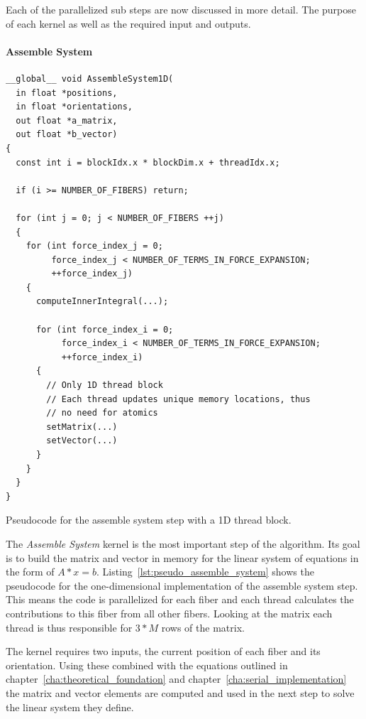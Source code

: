 \documentclass[a4paper,11pt]{kth-mag}
\begin{document}
Each of the parallelized sub steps are now discussed in more detail. The purpose of each kernel as well as the required input and outputs.

\paragraph{Assemble System}

\begin{listing}[!htbp]
  \centering
  \begin{verbatim}
__global__ void AssembleSystem1D(
  in float *positions,
  in float *orientations,
  out float *a_matrix,
  out float *b_vector)
{
  const int i = blockIdx.x * blockDim.x + threadIdx.x;

  if (i >= NUMBER_OF_FIBERS) return;

  for (int j = 0; j < NUMBER_OF_FIBERS ++j)
  {
    for (int force_index_j = 0;
         force_index_j < NUMBER_OF_TERMS_IN_FORCE_EXPANSION;
         ++force_index_j)
    {
      computeInnerIntegral(...);

      for (int force_index_i = 0;
           force_index_i < NUMBER_OF_TERMS_IN_FORCE_EXPANSION;
           ++force_index_i)
      {
        // Only 1D thread block
        // Each thread updates unique memory locations, thus
        // no need for atomics
        setMatrix(...)
        setVector(...)
      }
    }
  }
}
  \end{verbatim}
  \caption{Pseudocode for the assemble system step with a 1D thread block.}
  \label{lst:pseudo_assemble_system}
\end{listing}

The \emph{Assemble System} kernel is the most important step of the algorithm. Its goal is to build the matrix and vector in memory for the linear system of equations in the form of $A*x = b$. Listing~\ref{lst:pseudo_assemble_system} shows the pseudocode for the one-dimensional implementation of the assemble system step. This means the code is parallelized for each fiber and each thread calculates the contributions to this fiber from all other fibers. Looking at the matrix each thread is thus responsible for $3*M$ rows of the matrix.

The kernel requires two inputs, the current position of each fiber and its orientation. Using these combined with the equations outlined in chapter~\ref{cha:theoretical_foundation} and chapter~\ref{cha:serial_implementation} the matrix and vector elements are computed and used in the next step to solve the linear system they define.
\end{document}
